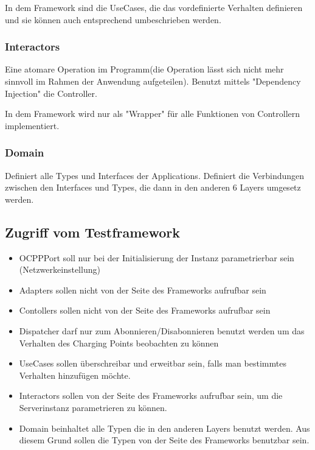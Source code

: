         In dem Framework sind die UseCases, die das vordefinierte Verhalten definieren und sie können auch entsprechend umbeschrieben werden.
        \subsubsection{Interactors}
        Eine atomare Operation im Programm(die Operation lässt sich nicht mehr sinnvoll im Rahmen der Anwendung aufgeteilen).
        Benutzt mittels "Dependency Injection" die Controller.

        In dem Framework wird nur als "Wrapper" für alle Funktionen von Controllern implementiert.
        \subsubsection{Domain}
        Definiert alle Types und Interfaces der Applications.
        Definiert die Verbindungen zwischen den Interfaces und Types, die dann in den anderen 6 Layers umgesetz werden.

    \subsection{Zugriff vom Testframework}
    \begin{itemize}
        \item OCPPPort soll nur bei der Initialisierung der Instanz parametrierbar sein (Netzwerkeinstellung)
        \item Adapters sollen nicht von der Seite des Frameworks aufrufbar sein
        \item Contollers sollen nicht von der Seite des Frameworks aufrufbar sein
        \item Dispatcher darf nur zum Abonnieren/Disabonnieren benutzt werden um das Verhalten des Charging Points beobachten zu können
        \item UseCases sollen überschreibar und erweitbar sein, falls man bestimmtes Verhalten hinzufügen möchte.
        \item Interactors sollen von der Seite des Frameworks aufrufbar sein, um die Serverinstanz parametrieren zu können.
        \item Domain beinhaltet alle Typen die in den anderen Layers benutzt werden. Aus diesem Grund sollen die Typen von der Seite des Frameworks benutzbar sein.
    \end{itemize}

